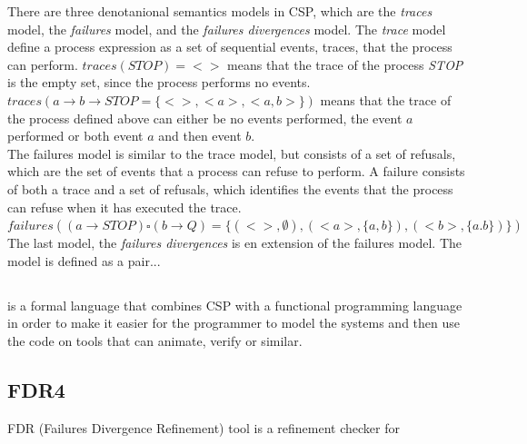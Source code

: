 There are three denotanional semantics models in CSP, which are the \textit{traces} model, the \textit{failures} model, and the \textit{failures divergences} model. The \textit{trace} model define a process expression as a set of sequential events, traces, that the process can perform. $traces(STOP) = {<>}$ means that the trace of the process \textit{STOP} is the empty set, since the process performs no events. $traces(a \rightarrow b \rightarrow STOP = \{<>, <a>, <a,b>\})$ means that the trace of the process defined above can either be no events performed, the event $a$ performed or both event $a$ and then event $b$.\\
The failures model is similar to the trace model, but consists of a set of refusals, which are the set of events that a process can refuse to perform. A failure consists of both a trace and a set of refusals, which identifies the events that the process can refuse when it has executed the trace. $failures((a \rightarrow STOP) \square (b \rightarrow Q) = \{(<>, \emptyset), (<a>, \{a,b\}), (<b>, \{a.b\})\})$\\
The last model, the \textit{failures divergences} is en extension of the failures model. The model is defined as a pair... %

\subsection{\cspm{}}
\cspm{} is a formal language that combines CSP with a functional programming language in order to make it easier for the programmer to model the systems and then use the code on tools that can animate, verify or similar.


\subsection{FDR4}
FDR (Failures Divergence Refinement) tool is a refinement checker for


